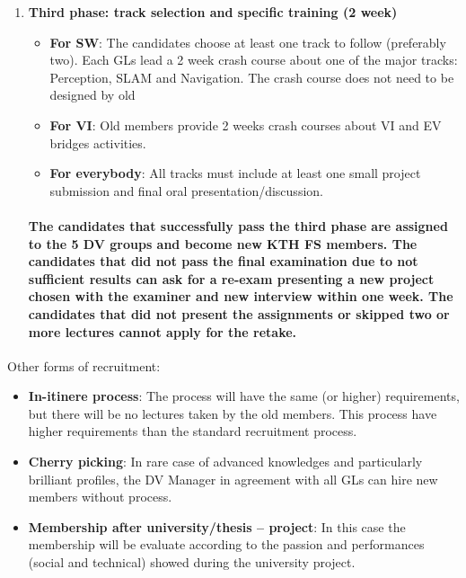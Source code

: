 \documentclass[graybox]{svmult}
\begin{document}
\begin{enumerate}
\item \textbf{Third phase: track selection and specific training (2 week)}
\begin{itemize}
\item \textbf{For SW}:
The candidates choose at least one track to follow (preferably two). Each GLs lead a 2 week crash course about one of the major tracks: Perception, SLAM and Navigation. The crash course does not need to be designed by old 
\item \textbf{For VI}:
Old members provide 2 weeks crash courses about VI and EV bridges activities.
\item \textbf{For everybody}: 
All tracks must include at least one small project submission and final oral presentation/discussion.
\end{itemize}

\paragraph{The candidates that successfully pass the third phase are assigned to the 5 DV groups and become new KTH FS members.
The candidates that did not pass the final examination due to not sufficient results can ask for a re-exam presenting a new project chosen with the examiner and new interview within one week.
The candidates that did not present the assignments or skipped two or more lectures cannot apply for the retake.}
\end{enumerate}

Other forms of recruitment:
\begin{itemize}
\item \textbf{In-itinere process}:
The process will have the same (or higher) requirements, but there will be no lectures taken by the old members. This process have higher requirements than the standard recruitment process.
\item \textbf{Cherry picking}:
In rare case of advanced knowledges and particularly brilliant profiles, the DV Manager in agreement with all GLs can hire new members without process.
\item \textbf{Membership after university/thesis – project}:
In this case the membership will be evaluate according to the passion and performances (social and technical) showed during the university project.
\end{itemize}
\end{document}
